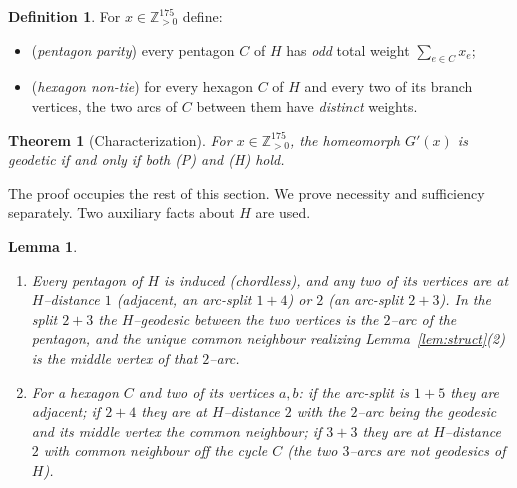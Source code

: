 \documentclass{amsart}
\newtheorem{theorem}{Theorem}
\newtheorem{lemma}{Lemma}
\theoremstyle{definition}
\newtheorem{definition}{Definition}
\begin{document}
\begin{definition}\label{def:conditions}
For $x\in\mathbb Z_{>0}^{175}$ define:
\begin{itemize}
\item[\textnormal{(P)}] (\emph{pentagon parity}) every pentagon $C$ of $H$ has
\emph{odd} total weight $\sum_{e\in C}x_e$;
\item[\textnormal{(H)}] (\emph{hexagon non-tie}) for every hexagon $C$ of $H$
and every two of its branch vertices, the two arcs of $C$ between them have
\emph{distinct} weights.
\end{itemize}
\end{definition}

\begin{theorem}[Characterization]\label{thm:main}
For $x\in\mathbb Z_{>0}^{175}$, the homeomorph $G'(x)$ is geodetic if and only
if both \textnormal{(P)} and \textnormal{(H)} hold.
\end{theorem}

The proof occupies the rest of this section. We prove necessity and sufficiency
separately. Two auxiliary facts about $H$ are used.

\begin{lemma}\label{lem:cycles}
\begin{enumerate}
\item Every pentagon of $H$ is induced (chordless), and any two of its vertices
are at $H$--distance $1$ (adjacent, an arc-split $1{+}4$) or $2$ (an arc-split
$2{+}3$). In the split $2{+}3$ the $H$--geodesic between the two vertices is the
$2$--arc of the pentagon, and the unique common neighbour realizing
Lemma~\ref{lem:struct}(2) is the middle vertex of that $2$--arc.
\item For a hexagon $C$ and two of its vertices $a,b$: if the arc-split is
$1{+}5$ they are adjacent; if $2{+}4$ they are at $H$--distance $2$ with the
$2$--arc being the geodesic and its middle vertex the common neighbour; if
$3{+}3$ they are at $H$--distance $2$ with common neighbour \emph{off} the cycle
$C$ (the two $3$--arcs are \emph{not} geodesics of $H$).
\end{enumerate}
\end{lemma}
\end{document}
